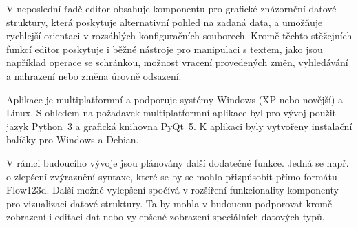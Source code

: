 \documentclass[FM,DP]{tulthesis}
\begin{document}
V neposlední řadě editor obsahuje komponentu pro grafické znázornění datové struktury, která poskytuje alternativní pohled na zadaná data, a umožňuje rychlejší orientaci v rozsáhlých konfiguračních souborech. Kromě těchto stěžejních funkcí editor poskytuje i běžné nástroje pro manipulaci s textem, jako jsou například operace se schránkou, možnost vracení provedených změn, vyhledávání a nahrazení nebo změna úrovně odsazení.

Aplikace je multiplatformní a podporuje systémy Windows (XP nebo novější) a Linux. S ohledem na požadavek multiplatformní aplikace byl pro vývoj použit jazyk Python~3 a grafická knihovna PyQt~5. K aplikaci byly vytvořeny instalační balíčky pro Windows a Debian.

V rámci budoucího vývoje jsou plánovány další dodatečné funkce. Jedná se např. o zlepšení zvýraznění syntaxe, které se by se mohlo přizpůsobit přímo formátu Flow123d. Další možné vylepšení spočívá v rozšíření funkcionality komponenty pro vizualizaci datové struktury. Ta by mohla v budoucnu podporovat kromě zobrazení i editaci dat nebo vylepšené zobrazení speciálních datových typů.
\end{document}
